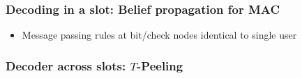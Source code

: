 \begin{frame}\frametitle{Decoding in a slot: Belief propagation for MAC }
\begin{itemize}
\item Message passing rules at bit/check nodes identical to single user
\end{itemize}

	\centering
	\vspace{2ex}
	\resizebox{0.85\textwidth}{!}{}
\end{frame}


\begin{frame}
\frametitle{Decoder across slots: $T$-Peeling}
\centering
\resizebox{0.85\textwidth}{!}{}

\end{frame}



